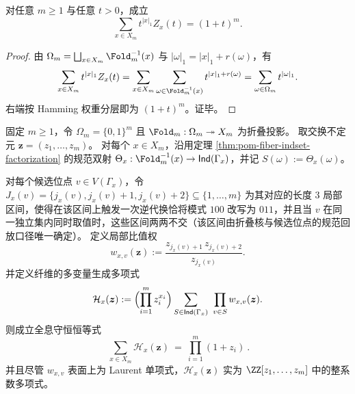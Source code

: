 \begin{theorem}[权重--纤维生成函数的二项式守恒律]\label{thm:pom-fiber-biased-weighted-partition-identity}
对任意 \(m\ge 1\) 与任意 \(t>0\)，成立
\begin{equation}\label{eq:pom-fiber-biased-binomial-conservation}
\sum_{x\in X_m} t^{|x|_1}Z_x(t)=(1+t)^m.
\end{equation}
\end{theorem}
\begin{proof}
由 \(\Omega_m=\bigsqcup_{x\in X_m}\Fold_m^{-1}(x)\) 与
\(
|\omega|_1=|x|_1+r(\omega)
\)，有
\[
\sum_{x\in X_m} t^{|x|_1}Z_x(t)
=\sum_{x\in X_m}\sum_{\omega\in\Fold_m^{-1}(x)}t^{|x|_1+r(\omega)}
=\sum_{\omega\in\Omega_m}t^{|\omega|_1}.
\]
右端按 Hamming 权重分层即为 \((1+t)^m\)。证毕。
\end{proof}

\begin{theorem}\label{thm:pom-fiber-multivariate-holographic-conservation}
固定 \(m\ge 1\)，令 \(\Omega_m=\{0,1\}^m\) 且 \(\Fold_m:\Omega_m\twoheadrightarrow X_m\) 为折叠投影。
取交换不定元 \(\boldsymbol{z}=(z_1,\dots,z_m)\)。
对每个 \(x\in X_m\)，沿用定理 \ref{thm:pom-fiber-indset-factorization} 的规范双射
\(
\Theta_x:\Fold_m^{-1}(x)\to \mathsf{Ind}(\Gamma_x)
\)，并记 \(S(\omega):=\Theta_x(\omega)\)。
\par
对每个候选位点 \(v\in V(\Gamma_x)\)，令 \(J_x(v)=\{j_x(v),j_x(v)+1,j_x(v)+2\}\subseteq\{1,\dots,m\}\) 为其对应的长度 \(3\) 局部区间，使得在该区间上触发一次逆代换恰将模式 \(100\) 改写为 \(011\)，并且当 \(v\) 在同一独立集内同时取值时，这些区间两两不交（该区间由折叠核与候选位点的规范回放口径唯一确定）。
定义局部比值权
\[
w_{x,v}(\boldsymbol{z})
:=\frac{z_{j_x(v)+1}\,z_{j_x(v)+2}}{z_{j_x(v)}}.
\]
并定义纤维的多变量生成多项式
\[
\mathcal H_x(\boldsymbol{z})
:=\Bigl(\prod_{i=1}^{m}z_i^{x_i}\Bigr)
\sum_{S\in\mathsf{Ind}(\Gamma_x)}\ \prod_{v\in S}w_{x,v}(\boldsymbol{z}).
\]
则成立全息守恒恒等式
\begin{equation}\label{eq:pom-fiber-multivariate-holographic-conservation}
\boxed{\ \sum_{x\in X_m}\mathcal H_x(\boldsymbol{z})\ =\ \prod_{i=1}^{m}(1+z_i)\ }.
\end{equation}
并且尽管 \(w_{x,v}\) 表面上为 Laurent 单项式，\(\mathcal H_x(\boldsymbol{z})\) 实为 \(\ZZ[z_1,\dots,z_m]\) 中的整系数多项式。
\end{theorem}


